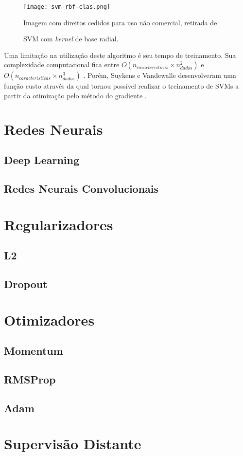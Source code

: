 \begin{figure}
\begin{center} {
    \begin{center}
    \texttt{[image: svm-rbf-clas.png]}
    \caption{SVM com \textit{kernel} de base radial.}
    \small Imagem com direitos cedidos para uso não comercial, retirada de \cite{vanderplas15}
    \label{fig:svm-rbf-clas}
    \end{center}
}
\end{center}
\end{figure}

Uma limitação na utilização deste algoritmo é seu tempo de treinamento. Sua complexidade computacional fica entre $O(n_{caracteristicas} \times n_{dados}^2)$ e $O(n_{caracteristicas} \times n_{dados}^3)$ \cite{list09}. Porém, Suykens e Vandewalle desenvolveram uma função custo através da qual tornou possível realizar o treinamento de SVMs a partir da otimização pelo método do gradiente \cite{suykens99}.

\section{Redes Neurais}

\subsection{Deep Learning}

\subsection{Redes Neurais Convolucionais}

\section{Regularizadores} \label{regularizadores}

\subsection{L2}

\subsection{Dropout}

\section{Otimizadores}

\subsection{Momentum}

\subsection{RMSProp}

\subsection{Adam}

\section{Supervisão Distante}
